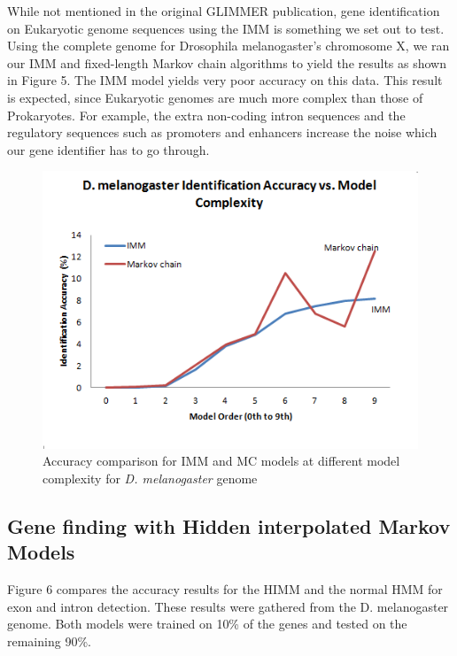 \documentclass[11pt,letterpaper]{article}
\begin{document}
While not mentioned in the original GLIMMER publication, gene identification on Eukaryotic genome sequences using the IMM is something we set out to test. Using the complete genome for Drosophila melanogaster’s chromosome X, we ran our IMM and fixed-length Markov chain algorithms to yield the results as shown in Figure 5. The IMM model yields very poor accuracy on this data. This result is expected, since Eukaryotic genomes are much more complex than those of Prokaryotes. For example, the extra non-coding intron sequences and the regulatory sequences such as promoters and enhancers increase the noise which our gene identifier has to go through. 

\begin{figure}
	\begin{center}
		\includegraphics[scale=0.8]{plots/accuracy_vs_model_complexity_drosophila.png}
	\end{center}
	\caption{\label{font-table} Accuracy comparison for IMM and MC models at different model complexity for \emph{D. melanogaster} genome}
\end{figure}


\subsection{Gene finding with Hidden interpolated Markov Models}

Figure 6 compares the accuracy results for the HIMM and the normal HMM for exon and intron detection. These results were gathered from the D. melanogaster genome. Both models were trained on 10\% of the genes and tested on the remaining 90\%.
\end{document}
